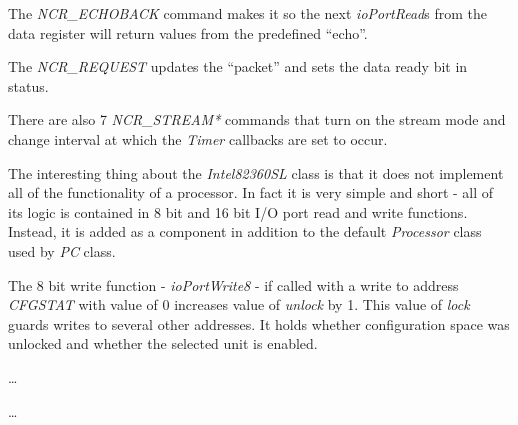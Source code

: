 The \emph{NCR\_ECHOBACK} command makes it so the next \emph{ioPortRead}s from
the data register will return values from the predefined ``echo''.

\begin{codeblock}
    
\end{codeblock}

The \emph{NCR\_REQUEST} updates the ``packet'' and sets the data ready bit in
status.

\begin{codeblock}
    
\end{codeblock}

There are also 7 \emph{NCR\_STREAM*} commands that turn on the stream mode and
change interval at which the \emph{Timer} callbacks are set to occur.

\begin{codeblock}
    
\end{codeblock}


The interesting thing about the \emph{Intel82360SL} class is that it does not
implement all of the functionality of a processor. In fact it is very simple
and short - all of its logic is contained in 8 bit and 16 bit I/O port read and
write functions. Instead, it is added as a component in addition to the default
\emph{Processor} class used by \emph{PC} class.

The 8 bit write function - \emph{ioPortWrite8} - if called with a write to
address \emph{CFGSTAT} with value of 0 increases value of \emph{unlock} by 1.
This value of \emph{lock} guards writes to several other addresses. It holds
whether configuration space was unlocked and whether the selected unit is
enabled. 

\begin{codeblock}
    
    \dots
    
    \dots
    
\end{codeblock}

